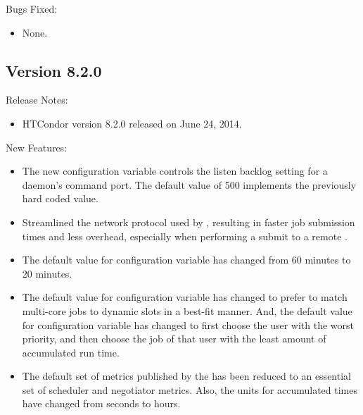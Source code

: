 \noindent Bugs Fixed:

\begin{itemize}

\item None.

\end{itemize}

\subsection*{\label{sec:New-8-2-0}Version 8.2.0}

\noindent Release Notes:

\begin{itemize}

\item HTCondor version 8.2.0 released on June 24, 2014.

\end{itemize}


\noindent New Features:

\begin{itemize}

\item The new configuration variable 
controls the listen backlog setting for a daemon's command port.
The default value of 500 implements the previously hard coded value.

\item Streamlined the network protocol used by ,
resulting in faster job submission times and less  overhead, 
especially when performing a submit to a remote .

\item The default value for configuration variable  
has changed from 60 minutes to 20 minutes.

\item The default value for configuration variable 
 has changed to prefer to match
multi-core jobs to dynamic slots in a best-fit manner.
And, the default value for configuration variable
 has changed to first choose the user with the
worst priority, and then choose the job of that user with the least
amount of accumulated run time. 

\item The default set of metrics published by the  has been
reduced to an essential set of scheduler and negotiator metrics.
Also, the units for accumulated times have changed from seconds to hours.

\end{itemize}

